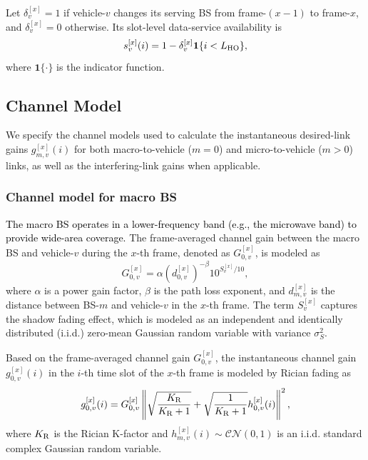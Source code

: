 \documentclass[10pt,journal,letterpaper]{IEEEtran}
\newcommand{\rev}[1]{\textcolor{revisioncolor}{{}#1}}
\newcommand{\omitted}[1]{}
\theoremstyle{remark}
\begin{document}
\rev{Let $\delta_v^{[x]}=1$ if vehicle-$v$ changes its serving BS from frame-$(x-1)$ to frame-$x$, and $\delta_v^{[x]}=0$ otherwise. Its slot-level data-service availability is}
\begin{equation}
    \rev{s_v^{[x]}(i)=1-\delta_v^{[x]}\mathbf{1}\{i<L_{\rm HO}\},}
    \label{eq:HO_availability}
\end{equation}
\rev{where $\mathbf{1}\{\cdot\}$ is the indicator function.}

\subsection{Channel Model}

We specify the channel models used to calculate the instantaneous desired-link gains $g_{m,v}^{[x]}(i)$ for both macro-to-vehicle ($m=0$) and micro-to-vehicle ($m>0$) links, as well as the \omitted{}\rev{interfering-link} gains when applicable.

\subsubsection{Channel model for macro BS}

\textcolor{black}{
The macro BS operates in a lower-frequency band (e.g., the microwave band) to provide wide-area coverage. 
}
The frame-averaged channel gain between the macro BS and vehicle-$v$ during the $x$-th frame, denoted as $G_{0,v}^{[x]}$, is modeled as
\begin{equation}
    G_{0,v}^{[x]} = \alpha \left(d_{0,v}^{[x]}\right)^{-\beta} 10^{S_v^{[x]}/10},
    \label{eq:avg channel gain}
\end{equation}
where $\alpha$ is a power gain factor, $\beta$ is the path loss exponent, and $d_{m,v}^{[x]}$ is the distance between BS-$m$ and vehicle-$v$ in the $x$-th frame. The term $S_v^{[x]}$ captures the shadow fading effect, which is modeled as an independent and identically distributed (i.i.d.) zero-mean Gaussian random variable with variance $\sigma_S^2$. 

Based on the frame-averaged channel gain $G_{0,v}^{[x]}$, the instantaneous channel gain $g_{0,v}^{[x]}(i)$ in the $i$-th time slot of the $x$-th frame is modeled by Rician fading as
\begin{equation}
    g_{0,v}^{[x]}(i) = G_{0,v}^{[x]}\left\|\sqrt{\frac{K_{\rm R}}{K_{\rm R}+1}} + \sqrt{\frac{1}{K_{\rm R}+1}} h_{0,v}^{[x]}(i)\right\|^2,
    \label{eq:instant channel condition}
\end{equation}
where $K_{\rm R}$ is the Rician K-factor and $h_{m,v}^{[x]}(i) \sim \mathcal{CN}\left(0,1\right)$ is an i.i.d. standard complex Gaussian random variable. 
\end{document}
